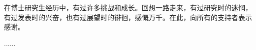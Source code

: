 
\begin{ack}

在博士研究生经历中，有过许多挑战和成长。回想一路走来，有过研究时的迷惘，有过发表时的兴奋，也有过展望时的徘徊，感慨万千。在此，向所有的支持者表示感谢。

......

\end{ack}

